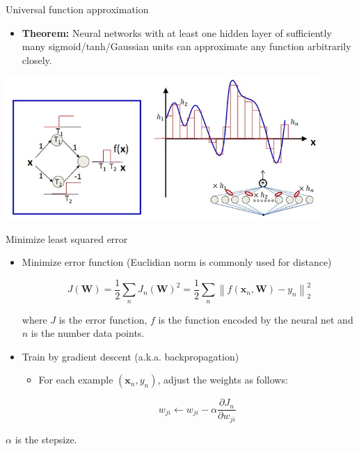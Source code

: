 \documentclass[11pt,table]{beamer}
\begin{document}
\begin{frame}{Universal function approximation}


\begin{itemize}
    \item \textbf{Theorem:} Neural networks with at least one hidden  layer of sufficiently many sigmoid/tanh/Gaussian  units can approximate any function arbitrarily closely.
 
\end{itemize}

\begin{center}
\includegraphics[width=0.9\textwidth]{figures/8.png}

\end{center}
    
\end{frame}

\begin{frame}{Minimize least squared error}


   \begin{itemize}
       \item  Minimize error function (Euclidian norm is commonly used for distance)

$$J(\boldsymbol{W})=\frac{1}{2} \sum_{n} J_{n}(\boldsymbol{W})^{2}=\frac{1}{2} \sum_{n}\left\|f\left(\boldsymbol{x}_{n}, \boldsymbol{W}\right)-y_{n}\right\|_{2}^{2}$$ 

where $J$ is the error function, $f$ is the function encoded by the neural net and $n$ is the number data points.

\item  Train by gradient descent (a.k.a. backpropagation)

\begin{itemize}
    \item  For each example $(\boldsymbol{x}_{n}, y_{n})$, adjust the weights as follows:

$$
w_{j i} \leftarrow w_{j i}-\alpha \frac{\partial J_{n}}{\partial w_{j i}}
$$ 
   \end{itemize} 
   \end{itemize}
	
	$\alpha$ is the stepsize.
\end{frame}
\end{document}
